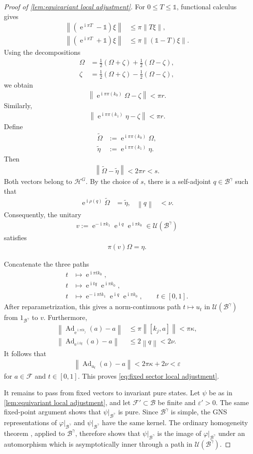 \documentclass[a4paper,10pt]{article}
\numberwithin{equation}{section}
\theoremstyle{plain}
\theoremstyle{plain}
\theoremstyle{plain}
\theoremstyle{plain}
\theoremstyle{plain}
\theoremstyle{remark}
\theoremstyle{definition}
\newcommand{\ee}{\operatorname{e}}
\newcommand{\ii}{\operatorname{i}}
\newcommand{\calB}{\mathcal{B}}
\newcommand{\calF}{\mathcal{F}}
\newcommand{\calU}{\mathcal{U}}
\newcommand{\calH}{\mathcal{H}}
\newcommand\norm[1]{\left\lVert#1\right\rVert}
\newcommand{\Ad}[1]{\operatorname{Ad}_{#1}}
\newcommand{\Id}{\mathds{1}}
\newcommand{\eq}[1]{\begin{align*}#1\end{align*}}
\newcommand{\onehalf}{\frac{1}{2}}
\newcommand{\br}[1]{\left(#1\right)}
\begin{document}
\begin{proof}[Proof of \cref{lem:equivariant local adjustment}]
For \(0\leq T\leq\Id\), functional calculus gives
\eq{
    \norm{
        \br{
            \ee^{\ii\pi T}-\Id
        }\xi
    }
    &\leq
    \pi\norm{T\xi},\\
    \norm{
        \br{
            \ee^{\ii\pi T}+\Id
        }\xi
    }
    &\leq
    \pi\norm{
        \br{
            \Id-T
        }\xi
    }.
}
Using the decompositions
\eq{
    \Omega
    &=
    \onehalf
    \br{
        \Omega+\zeta
    }
    +
    \onehalf
    \br{
        \Omega-\zeta
    },\\
    \zeta
    &=
    \onehalf
    \br{
        \Omega+\zeta
    }
    -
    \onehalf
    \br{
        \Omega-\zeta
    },
}
we obtain
\eq{
    \norm{
        \ee^{\ii\pi\pi(k_0)}\Omega-\zeta
    }
    <
    \pi r.
}
Similarly,
\eq{
    \norm{
        \ee^{\ii\pi\pi(k_1)}\eta-\zeta
    }
    <
    \pi r.
}
Define
\eq{
    \widetilde\Omega
    &:=
    \ee^{\ii\pi\pi(k_0)}\Omega,\\
    \widetilde\eta
    &:=
    \ee^{\ii\pi\pi(k_1)}\eta.
}
Then
\eq{
    \norm{
        \widetilde\Omega-\widetilde\eta
    }
    <
    2\pi r
    <
    s.
}
Both vectors belong to \(\calH^G\). By the choice of \(s\), there is
a self-adjoint \(q\in\calB^\gamma\) such that
\eq{
    \ee^{\ii\rho(q)}
    \widetilde\Omega
    &=
    \widetilde\eta,&
    \norm{q}
    &<
    \nu.
}
Consequently, the unitary
\eq{
    v
    :=
    \ee^{-\ii\pi k_1}
    \ee^{\ii q}
    \ee^{\ii\pi k_0}
    \in
    \calU(\calB^\gamma)
}
satisfies
\eq{
    \pi(v)\Omega
    =
    \eta.
}

Concatenate the three paths
\eq{
    t
    &\longmapsto
    \ee^{\ii\pi t k_0},\\
    t
    &\longmapsto
    \ee^{\ii t q}
    \ee^{\ii\pi k_0},\\
    t
    &\longmapsto
    \ee^{-\ii\pi t k_1}
    \ee^{\ii q}
    \ee^{\ii\pi k_0},
    \qquad
    t\in[0,1].
}
After reparametrization, this gives a norm-continuous path
\(t\mapsto u_t\) in \(\calU(\calB^\gamma)\) from
\(1_{\calB^\gamma}\) to \(v\). Furthermore,
\eq{
    \norm{
        \Ad{\ee^{\ii\pi t k_j}}(a)-a
    }
    &\leq
    \pi\norm{
        [k_j,a]
    }
    <
    \pi\kappa,\\
    \norm{
        \Ad{\ee^{\ii t q}}(a)-a
    }
    &\leq
    2\norm{q}
    <
    2\nu.
}
It follows that
\eq{
    \norm{
        \Ad{u_t}(a)-a
    }
    <
    2\pi\kappa+2\nu
    <
    \varepsilon
}
for \(a\in\calF\) and \(t\in[0,1]\). This proves
\cref{eq:fixed sector local adjustment}.

It remains to pass from fixed vectors to invariant pure states. Let
\(\psi\) be as in
\cref{lem:equivariant local adjustment}, and let
\(\calF'\subset\calB\) be finite and \(\varepsilon'>0\).
The same fixed-point argument shows that
\(\psi|_{\calB^\gamma}\) is pure. Since \(\calB^\gamma\) is simple,
the GNS representations of \(\varphi|_{\calB^\gamma}\) and
\(\psi|_{\calB^\gamma}\) have the same kernel. The ordinary
homogeneity theorem
\cite[Theorem~2.1]{KishimotoOzawaSakai2003Homogeneity}, applied to
\(\calB^\gamma\), therefore shows that
\(\psi|_{\calB^\gamma}\) is the image of
\(\varphi|_{\calB^\gamma}\) under an automorphism which is
asymptotically inner through a path in \(\calU(\calB^\gamma)\).


\end{proof}
\end{document}
